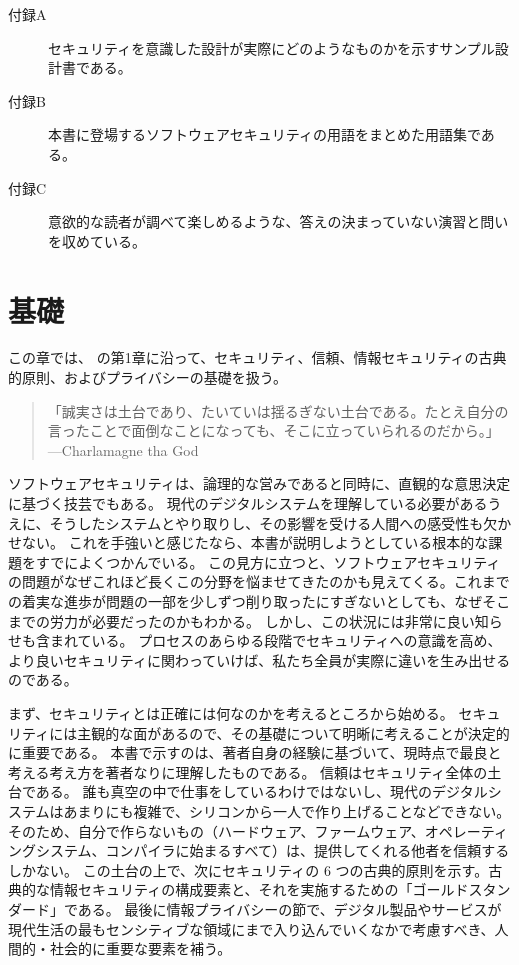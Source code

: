 \documentclass[uplatex]{jsarticle}
\begin{document}
\begin{description}
  \item[付録A] セキュリティを意識した設計が実際にどのようなものかを示すサンプル設計書である。
  \item[付録B] 本書に登場するソフトウェアセキュリティの用語をまとめた用語集である。
  \item[付録C] 意欲的な読者が調べて楽しめるような、答えの決まっていない演習と問いを収めている。
\end{description}

\newpage

\section{基礎}

この章では、\cite{Kohnfelder2021} の第1章に沿って、セキュリティ、信頼、情報セキュリティの古典的原則、およびプライバシーの基礎を扱う。

\begin{quote}
「誠実さは土台であり、たいていは揺るぎない土台である。たとえ自分の言ったことで面倒なことになっても、そこに立っていられるのだから。」
\hfill ---Charlamagne tha God
\end{quote}

ソフトウェアセキュリティは、論理的な営みであると同時に、直観的な意思決定に基づく技芸でもある。
現代のデジタルシステムを理解している必要があるうえに、そうしたシステムとやり取りし、その影響を受ける人間への感受性も欠かせない。
これを手強いと感じたなら、本書が説明しようとしている根本的な課題をすでによくつかんでいる。
この見方に立つと、ソフトウェアセキュリティの問題がなぜこれほど長くこの分野を悩ませてきたのかも見えてくる。これまでの着実な進歩が問題の一部を少しずつ削り取ったにすぎないとしても、なぜそこまでの労力が必要だったのかもわかる。
しかし、この状況には非常に良い知らせも含まれている。
プロセスのあらゆる段階でセキュリティへの意識を高め、より良いセキュリティに関わっていけば、私たち全員が実際に違いを生み出せるのである。

まず、セキュリティとは正確には何なのかを考えるところから始める。
セキュリティには主観的な面があるので、その基礎について明晰に考えることが決定的に重要である。
本書で示すのは、著者自身の経験に基づいて、現時点で最良と考える考え方を著者なりに理解したものである。
信頼はセキュリティ全体の土台である。
誰も真空の中で仕事をしているわけではないし、現代のデジタルシステムはあまりにも複雑で、シリコンから一人で作り上げることなどできない。そのため、自分で作らないもの（ハードウェア、ファームウェア、オペレーティングシステム、コンパイラに始まるすべて）は、提供してくれる他者を信頼するしかない。
この土台の上で、次にセキュリティの 6 つの古典的原則を示す。古典的な情報セキュリティの構成要素と、それを実施するための「ゴールドスタンダード」である。
最後に情報プライバシーの節で、デジタル製品やサービスが現代生活の最もセンシティブな領域にまで入り込んでいくなかで考慮すべき、人間的・社会的に重要な要素を補う。
\end{document}
